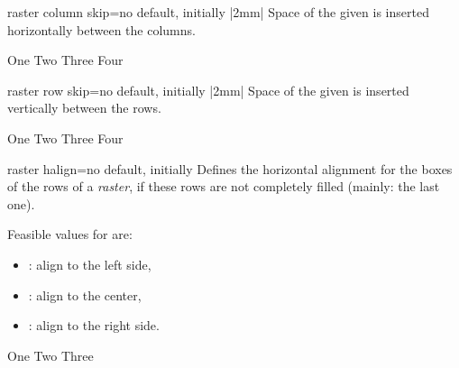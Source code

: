\enlargethispage*{1cm}

\begin{docTcbKey}[][doc new=2014-11-10]{raster column skip}{=}{no default, initially |2mm|}
 Space of the given  is inserted horizontally between the columns.
\begin{dispExample}
\begin{tcbitemize}[raster column skip=2cm,
  size=small,colframe=red!50!black,colback=red!10!white]
  \tcbitem One
  \tcbitem Two
  \tcbitem Three
  \tcbitem Four
\end{tcbitemize}
\end{dispExample}
\end{docTcbKey}

\begin{docTcbKey}[][doc new=2014-11-10]{raster row skip}{=}{no default, initially |2mm|}
 Space of the given  is inserted vertically between the rows.
\begin{dispExample}
\begin{tcbitemize}[raster row skip=0pt,
  size=small,colframe=red!50!black,colback=red!10!white]
  \tcbitem One
  \tcbitem Two
  \tcbitem Three
  \tcbitem Four
\end{tcbitemize}
\end{dispExample}
\end{docTcbKey}

\clearpage

\begin{docTcbKey}[][doc new=2014-11-10]{raster halign}{=}{no default, initially }
  Defines the horizontal alignment for the boxes of the rows of a \emph{raster},
  if these rows are not completely filled (mainly: the last one).

  Feasible values for  are:
  \begin{itemize}
  \item{}: align to the left side,
  \item{}: align to the center,
  \item{}: align to the right side.
  \end{itemize}

\begin{dispExample}
\begin{tcbitemize}[raster halign=center,
  size=small,colframe=red!50!black,colback=red!10!white]
  \tcbitem One
  \tcbitem Two
  \tcbitem Three
\end{tcbitemize}
\end{dispExample}
\end{docTcbKey}


